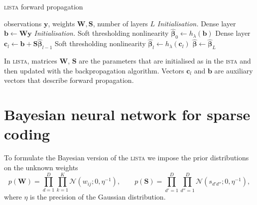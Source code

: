\documentclass{article}
\begin{document}
\begin{algorithm}[h]
  \caption{\textsc{lista} forward propagation}
  \label{alg:lista}
  \begin{algorithmic}[1]
    \REQUIRE observations $\mathbf{y}$, weights $\mathbf{W}, \mathbf{S}$, number of layers $L$
    \STATE \textit{Initialisation.} Dense layer $\mathbf{b} \gets \mathbf{W}\mathbf{y}$ \label{eq:first_layer}
    \STATE \textit{Initialisation.} Soft thresholding nonlinearity $\widehat{\boldsymbol\beta}_0 \gets h_\lambda(\mathbf{b})$ \label{eq:thr_first}
			\STATE Dense layer $\mathbf{c}_l \gets \mathbf{b} + \mathbf{S}\widehat{\boldsymbol\beta}_{l-1}$ \label{eq:l_dense_layer}
			\STATE Soft thresholding nonlinearity $\widehat{\boldsymbol\beta}_{l} \gets h_\lambda(\mathbf{c}_l)$ \label{eq:l_thr}
		\ENDFOR
		\RETURN $\widehat{\boldsymbol\beta} \gets \widehat{\boldsymbol\beta}_{L}$
  \end{algorithmic}
\end{algorithm}


In \textsc{lista}, matrices $\mathbf{W}$, $\mathbf{S}$ are the parameters that are initialised as in the \textsc{ista} and then updated with the backpropagation algorithm. Vectors $\mathbf{c}_l$ and $\mathbf{b}$ are auxiliary vectors that describe forward propagation.

\section{Bayesian neural network for sparse coding}
\label{sec:bayesian_lista}
To formulate the Bayesian version of the \textsc{lista} we impose the prior distributions on the unknown weights
\begin{equation}
\label{eq:ws}
p(\mathbf{W}) = \prod_{d=1}^D\prod_{k=1}^K \mathcal{N}(w_{ij} ; 0, \eta^{-1}), \qquad
p(\mathbf{S}) = \prod_{d'=1}^D\prod_{d''=1}^D \mathcal{N}(s_{d'd''} ; 0, \eta^{-1}),
\end{equation}
where $\eta$ is the precision of the Gaussian distribution.
\end{document}
